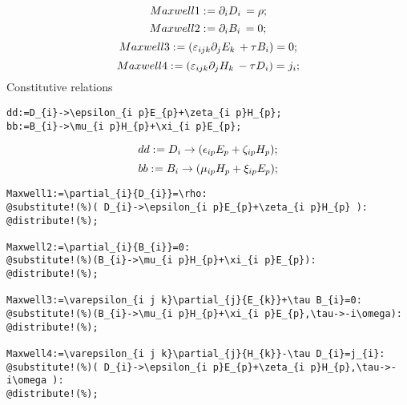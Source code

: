 \documentclass[11pt]{article}
\def\specialcolon{\mathrel{\mathop{:}}\hspace{-.5em}}
\begin{document}
\begin{dmath*}[compact, spread=2pt]
Maxwell1\specialcolon{}= {\partial}_{i}{{D}_{i}}\,  = \rho;
\end{dmath*}
\begin{dmath*}[compact, spread=2pt]
Maxwell2\specialcolon{}= {\partial}_{i}{{B}_{i}}\,  = 0;
\end{dmath*}
\begin{dmath*}[compact, spread=2pt]
Maxwell3\specialcolon{}= ({\varepsilon}_{i j k} {\partial}_{j}{{E}_{k}}\,  + \tau {B}_{i}) = 0;
\end{dmath*}
\begin{dmath*}[compact, spread=2pt]
Maxwell4\specialcolon{}= ({\varepsilon}_{i j k} {\partial}_{j}{{H}_{k}}\,  - \tau {D}_{i}) = {j}_{i};
\end{dmath*}
Constitutive relations
{\color[named]{Blue}\begin{verbatim}
dd:=D_{i}->\epsilon_{i p}E_{p}+\zeta_{i p}H_{p};
bb:=B_{i}->\mu_{i p}H_{p}+\xi_{i p}E_{p};
\end{verbatim}}
\begin{dmath*}[compact, spread=2pt]
dd\specialcolon{}= {D}_{i} \rightarrow ({\epsilon}_{i p} {E}_{p} + {\zeta}_{i p} {H}_{p});
\end{dmath*}
\begin{dmath*}[compact, spread=2pt]
bb\specialcolon{}= {B}_{i} \rightarrow ({\mu}_{i p} {H}_{p} + {\xi}_{i p} {E}_{p});
\end{dmath*}
{\color[named]{Blue}\begin{verbatim}
Maxwell1:=\partial_{i}{D_{i}}=\rho:
@substitute!(%)( D_{i}->\epsilon_{i p}E_{p}+\zeta_{i p}H_{p} ):
@distribute!(%);

Maxwell2:=\partial_{i}{B_{i}}=0:
@substitute!(%)(B_{i}->\mu_{i p}H_{p}+\xi_{i p}E_{p}):
@distribute!(%);

Maxwell3:=\varepsilon_{i j k}\partial_{j}{E_{k}}+\tau B_{i}=0:
@substitute!(%)(B_{i}->\mu_{i p}H_{p}+\xi_{i p}E_{p},\tau->-i\omega):
@distribute!(%);

Maxwell4:=\varepsilon_{i j k}\partial_{j}{H_{k}}-\tau D_{i}=j_{i}:
@substitute!(%)( D_{i}->\epsilon_{i p}E_{p}+\zeta_{i p}H_{p},\tau->-i\omega ):
@distribute!(%);
\end{verbatim}}
\end{document}
